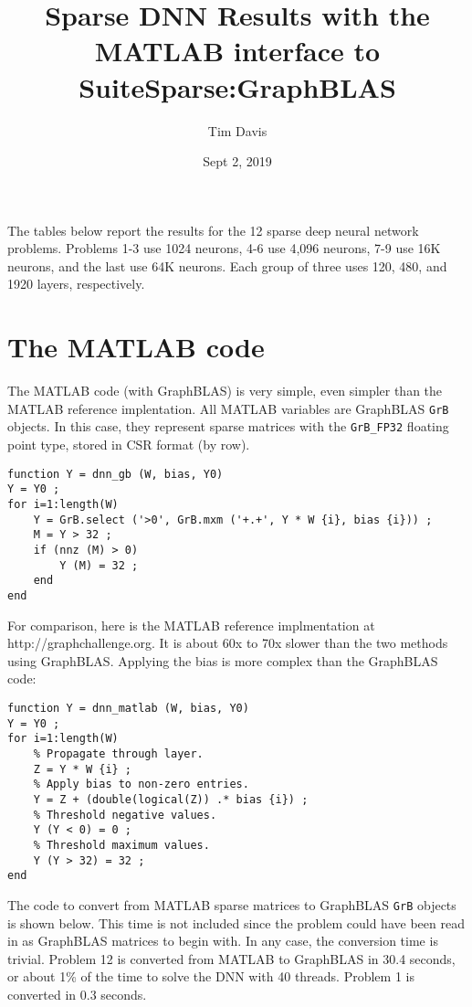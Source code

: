 \documentclass[12pt]{article}
\title{Sparse DNN Results with the MATLAB interface to SuiteSparse:GraphBLAS}
\author{Tim Davis}
\date{Sept 2, 2019}
\begin{document}
\maketitle


The tables below report the results for the 12 sparse deep neural network
problems.  Problems 1-3 use 1024 neurons, 4-6 use 4,096 neurons, 7-9 use 16K
neurons, and the last use 64K neurons.  Each group of three uses 120, 480, and
1920 layers, respectively.

\section{The MATLAB code}

The MATLAB code (with GraphBLAS) is very simple, even simpler than the MATLAB
reference implentation.  All MATLAB variables are GraphBLAS \verb'GrB' objects.
In this case, they represent sparse matrices with the \verb'GrB_FP32' floating
point type, stored in CSR format (by row).

{\footnotesize
\begin{verbatim}
function Y = dnn_gb (W, bias, Y0)
Y = Y0 ;
for i=1:length(W)
    Y = GrB.select ('>0', GrB.mxm ('+.+', Y * W {i}, bias {i})) ;
    M = Y > 32 ;
    if (nnz (M) > 0)
        Y (M) = 32 ;
    end
end
\end{verbatim}}

For comparison, here is the MATLAB reference implmentation at \newline
http://graphchallenge.org.  It is about 60x to 70x slower than the two methods
using GraphBLAS.  Applying the bias is more complex than the GraphBLAS code:

{\footnotesize
\begin{verbatim}
function Y = dnn_matlab (W, bias, Y0)
Y = Y0 ;
for i=1:length(W)
    % Propagate through layer.
    Z = Y * W {i} ;
    % Apply bias to non-zero entries.
    Y = Z + (double(logical(Z)) .* bias {i}) ;
    % Threshold negative values.
    Y (Y < 0) = 0 ;
    % Threshold maximum values.
    Y (Y > 32) = 32 ;
end
\end{verbatim}}

The code to convert from MATLAB sparse matrices to GraphBLAS \verb'GrB' objects
is shown below.  This time is not included since the problem could have been
read in as GraphBLAS matrices to begin with.  In any case, the conversion time
is trivial.  Problem 12 is converted from MATLAB to GraphBLAS in 30.4 seconds,
or about 1\% of the time to solve the DNN with 40 threads.  Problem 1 is
converted in 0.3 seconds.
\end{document}

